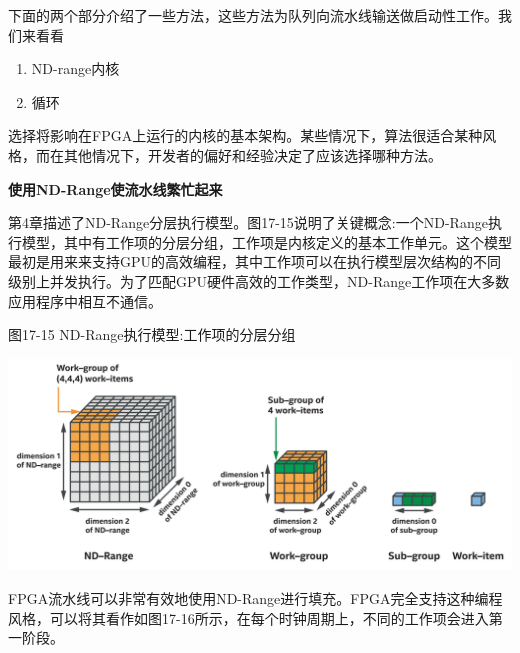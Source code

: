 下面的两个部分介绍了一些方法，这些方法为队列向流水线输送做启动性工作。我们来看看\par

\begin{enumerate}
	\item ND-range内核
	\item 循环
\end{enumerate}

选择将影响在FPGA上运行的内核的基本架构。某些情况下，算法很适合某种风格，而在其他情况下，开发者的偏好和经验决定了应该选择哪种方法。\par

\hspace*{\fill} \par %
\textbf{使用ND-Range使流水线繁忙起来}

第4章描述了ND-Range分层执行模型。图17-15说明了关键概念:一个ND-Range执行模型，其中有工作项的分层分组，工作项是内核定义的基本工作单元。这个模型最初是用来来支持GPU的高效编程，其中工作项可以在执行模型层次结构的不同级别上并发执行。为了匹配GPU硬件高效的工作类型，ND-Range工作项在大多数应用程序中相互不通信。\par

\hspace*{\fill} \par %
图17-15 ND-Range执行模型:工作项的分层分组
\begin{center}
	\includegraphics[width=1.0\textwidth]{content/chapter-17/images/14}
\end{center}

FPGA流水线可以非常有效地使用ND-Range进行填充。FPGA完全支持这种编程风格，可以将其看作如图17-16所示，在每个时钟周期上，不同的工作项会进入第一阶段。\par

